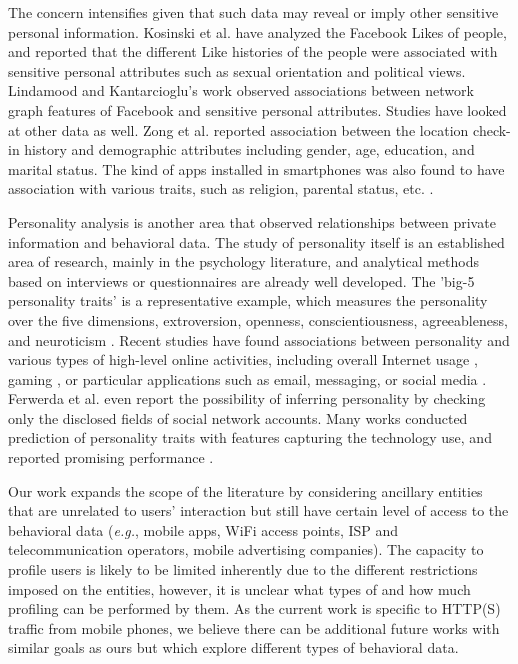 The concern intensifies given that such data may reveal or imply other sensitive personal information. Kosinski et al. \cite{kosinski2013private} have analyzed the Facebook Likes of people, and reported that the different Like histories of the people were associated with sensitive personal attributes such as sexual orientation and political views. Lindamood and Kantarcioglu's work \cite{lindamood2009inferring} observed associations between network graph features of Facebook and sensitive personal attributes. Studies have looked at other data as well. Zong et al. \cite{zhong2015you} reported association between the location check-in history and demographic attributes including gender, age, education, and marital status. The kind of apps installed in smartphones was also found to have association with various traits, such as religion, parental status, etc. \cite{seneviratne2014predicting}.

Personality analysis is another area that observed relationships between private information and behavioral data. The study of personality itself is an established area of research, mainly in the psychology literature, and analytical methods based on interviews or questionnaires are already well developed. The 'big-5 personality traits' is a representative example, which measures the personality over the five dimensions,  extroversion, openness, conscientiousness, agreeableness, and neuroticism \cite{goldberg2006international}. Recent studies have found associations between personality and various types of high-level online activities, including overall Internet usage \cite{landers2006investigation}, gaming \cite{jeong2015addictive}, or particular applications such as email, messaging, or social media \cite{tosun2010does}. Ferwerda et al. \cite{ferwerda2016personality} even report the possibility of inferring personality by checking only the disclosed fields of social network accounts. Many works conducted prediction of personality traits with features capturing the technology use, and reported promising performance \cite{de2013predicting, staiano2014money, carrascosa2015always, ramirez2010relationship, tsao2013big}. 

Our work expands the scope of the literature by considering ancillary entities that are unrelated to users' interaction but still have certain level of access to the behavioral data (\textit{e.g.}, mobile apps, WiFi access points, ISP and telecommunication operators, mobile advertising companies). The capacity to profile users is likely to be limited inherently due to the different restrictions imposed on the entities, however, it is unclear what types of and how much profiling  can be performed by them. As the current work is specific to HTTP(S) traffic from mobile phones, we believe there can be additional future works with similar goals as ours but which explore different types of behavioral data.


